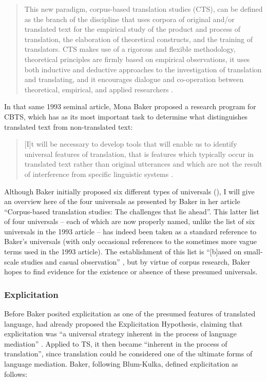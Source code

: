 \begin{quote}
This new paradigm, corpus-based translation studies (CTS), can be defined as the branch of the discipline that uses corpora of original and/or translated text for the empirical study of the product and process of translation, the elaboration of theoretical constructs, and the training of translators. CTS makes use of a rigorous and flexible methodology, theoretical principles are firmly based on empirical observations, it uses both inductive and deductive approaches to the investigation of translation and translating, and it encourages dialogue and co-operation between theoretical, empirical, and applied researchers \citep[45]{granger_corpora_2003}.
\end{quote}

In that same 1993 seminal article, Mona Baker proposed a research program for CBTS, which has as its most important task to determine what distinguishes translated text from non-translated text:

\begin{quote}
[I]t will be necessary to develop tools that will enable us to identify universal features of translation, that is features which typically occur in translated text rather than original utterances and which are not the result of interference from specific linguistic systems \citep[243]{baker_corpus_1993}.
\end{quote}

Although Baker initially proposed six different types of universals (\citeyear[243--245]{baker_corpus_1993}), I will give an overview here of the four universals as presented by Baker in her \citeyear{baker_corpus-based_1996} article “Corpus-based translation studies: The challenges that lie ahead”. This latter list of four universals – each of which are now properly named, unlike the list of six universals in the 1993 article – has indeed been taken as a standard reference to Baker’s universals (with only occasional references to the sometimes more vague terms used in the 1993 article). The establishment of this list is “[b]ased on small-scale studies and casual observation” \citep[243]{baker_corpus_1993}, but by virtue of corpus research, Baker hopes to find evidence for the existence or absence of these presumed universals.

\subsubsection{Explicitation}
\label{sec:2.2.2.1}  
Before Baker posited explicitation as one of the presumed features of translated language, \citet{house_shifts_1986} had already proposed the Explicitation Hypothesis, claiming that explicitation was “a universal strategy inherent in the process of language mediation” \citep[21]{house_shifts_1986}. Applied to TS, it then became “inherent in the process of translation”, since translation could be considered one of the ultimate forms of language mediation. Baker, following Blum-Kulka, defined explicitation as follows:

